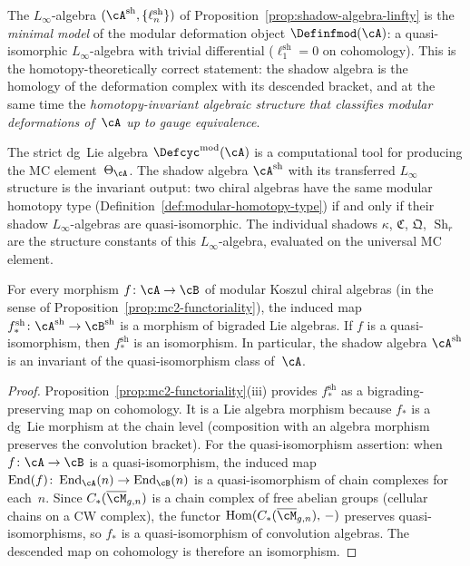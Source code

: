 \begin{remark}
\label{rem:shadow-algebra-minimal-model}
The $L_\infty$-algebra $(\cA^{\mathrm{sh}},
\{\ell_n^{\mathrm{sh}}\})$ of
Proposition~\textup{\ref{prop:shadow-algebra-linfty}} is the
\emph{minimal model} of the modular deformation object
$\Definfmod(\cA)$: a quasi-isomorphic $L_\infty$-algebra with
trivial differential ($\ell_1^{\mathrm{sh}} = 0$ on cohomology).
This is the homotopy-theoretically correct statement:
the shadow algebra is the homology of the deformation
complex with its descended bracket, and at the same time the
\emph{homotopy-invariant algebraic structure that classifies
modular deformations of~$\cA$ up to gauge equivalence}.

The strict dg~Lie algebra $\Defcyc^{\mathrm{mod}}(\cA)$ is a
computational tool for producing the MC element~$\Theta_\cA$.
The shadow algebra $\cA^{\mathrm{sh}}$ with its transferred
$L_\infty$ structure is the invariant output: two chiral algebras
have the same modular homotopy type
(Definition~\ref{def:modular-homotopy-type}) if and only if their
shadow $L_\infty$-algebras are quasi-isomorphic.  The individual
shadows $\kappa$, $\mathfrak{C}$, $\mathfrak{Q}$,
$\operatorname{Sh}_r$ are the structure constants of this
$L_\infty$-algebra, evaluated on the universal MC element.
\end{remark}

\begin{corollary}
\label{cor:shadow-algebra-functoriality}
For every morphism $f\colon \cA \to \cB$ of modular Koszul
chiral algebras \textup{(}in the sense of
Proposition~\textup{\ref{prop:mc2-functoriality})},
the induced map
$f_*^{\mathrm{sh}}\colon \cA^{\mathrm{sh}} \to
\cB^{\mathrm{sh}}$
is a morphism of bigraded Lie algebras.
If $f$ is a quasi-isomorphism, then $f_*^{\mathrm{sh}}$ is
an isomorphism.  In particular, the shadow algebra
$\cA^{\mathrm{sh}}$ is an invariant of the
quasi-isomorphism class of~$\cA$.
\end{corollary}

\begin{proof}
Proposition~\ref{prop:mc2-functoriality}(iii) provides
$f_*^{\mathrm{sh}}$ as a bigrading-preserving map on
cohomology.  It is a Lie algebra morphism because
$f_*$ is a dg~Lie morphism at the chain level
(composition with an algebra morphism preserves the
convolution bracket).  For the quasi-isomorphism
assertion: when $f\colon \cA \to \cB$ is a
quasi-isomorphism, the induced map
$\operatorname{End}(f)\colon \operatorname{End}_\cA(n)
\to \operatorname{End}_\cB(n)$ is a quasi-isomorphism
of chain complexes for each~$n$.  Since
$C_*(\overline{\cM}_{g,n})$ is a chain complex of
free abelian groups \textup{(}cellular chains on a
CW complex\textup{)}, the functor
$\operatorname{Hom}(C_*(\overline{\cM}_{g,n}),\, -)$
preserves quasi-isomorphisms, so
$f_*$ is a quasi-isomorphism of convolution algebras.
The descended map on cohomology is therefore an
isomorphism.
\end{proof}

